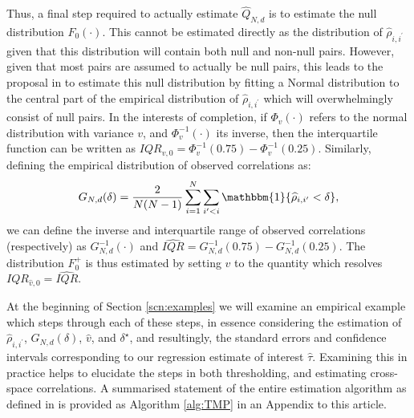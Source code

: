 \documentclass[varwidth,bib]{statapress}
\begin{document}
Thus, a final step required to actually estimate $\widehat{Q}_{N,d}$ is to estimate the null distribution $F_0(\cdot)$.  This cannot be estimated directly as the distribution of $\widehat\rho_{i,i^\prime}$ given that this distribution will contain both null and non-null pairs.  However, given that most pairs are assumed to actually be null pairs, this leads to the proposal in \citet{Dellavignaetal2025} to estimate this null distribution by fitting a Normal distribution to the central part of the empirical distribution of $\widehat\rho_{i,i^\prime}$ which will overwhelmingly consist of null pairs.  In the interests of completion, if $\Phi_v(\cdot)$ refers to the normal distribution with variance $v$, and $\Phi^{-1}_v(\cdot)$ its inverse, then the interquartile function can be written as $IQR_{v,0}=\Phi^{-1}_v(0.75)-\Phi^{-1}_v(0.25)$. Similarly, defining the empirical distribution of observed correlations as:
\[
G_{N,d}(\delta)=\frac{2}{N(N-1)}\sum_{i=1}^N\sum_{i^\prime<i}\mathbbm{1}\{\widehat\rho_{i,i^\prime}<\delta\},
\]
we can define the inverse and interquartile range of observed correlations (respectively) as $G^{-1}_{N,d}(\cdot)$ and $\widehat{IQR}=G^{-1}_{N,d}(0.75)-G^{-1}_{N,d}(0.25)$.  The distribution $F^+_0$ is thus estimated by setting $v$ to the quantity which resolves $IQR_{\widehat{v},0}=\widehat{IQR}$.



At the beginning of Section \ref{scn:examples} we will examine an empirical example which steps through each of these steps, in essence considering the estimation of $\widehat\rho_{i,i^\prime}$, $G_{N,d}(\delta)$, $\widehat{v}$, and $\delta^\star$, and resultingly, the standard errors and confidence intervals corresponding to our regression estimate of interest $\widehat\tau$.  Examining this in practice helps to elucidate the steps in both thresholding, and estimating cross-space correlations.  A summarised statement of the entire estimation algorithm as defined in \citet{Dellavignaetal2025} is provided as
Algorithm \ref{alg:TMP} in an Appendix to this article.
\end{document}
